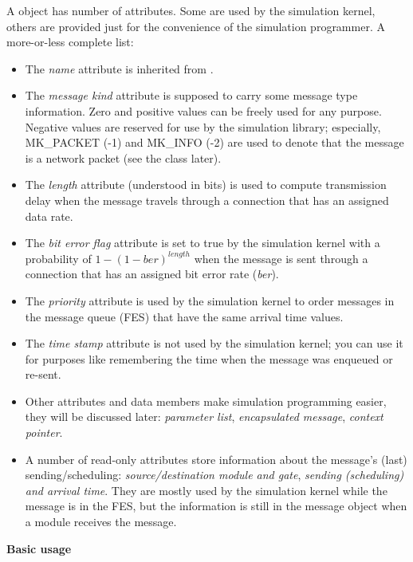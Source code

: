 A  object has number of attributes. Some are used by 
the simulation kernel, others are provided just for the convenience 
of the simulation programmer. A more-or-less complete list:
\begin{itemize}
  \item{The \textit{name} attribute is inherited from .}
  \item{The \textit{message kind} attribute is supposed to carry some message 
    type information. Zero and positive values can be freely used 
    for any purpose. Negative values are reserved for use by the 
    {\opp} simulation library; especially, MK\_PACKET (-1) and MK\_INFO 
    (-2) are used to denote that the message is a network packet 
    (see the  class later).}
  \item{The \textit{length} attribute (understood in bits) is used to compute 
    transmission delay when the message travels through a connection 
    that has an assigned data rate.}
  \item{The \textit{bit error flag} attribute is set to true by the simulation 
    kernel with a probability of $1-(1-\textit{ber})^{\mathit{length}}$ when the 
    message is sent through a connection that has an assigned bit 
    error rate (\textit{ber}).}
  \item{The \textit{priority} attribute is used by the simulation kernel to 
    order messages in the message queue (FES) that have the same 
    arrival time values.}
  \item{The \textit{time stamp} attribute is not used by the simulation kernel; 
    you can use it for purposes like remembering the time when the 
    message was enqueued or re-sent.}
  \item{Other attributes and data members make simulation programming 
    easier, they will be discussed later: \textit{parameter list}, \textit{encapsulated 
      message}, \textit{context pointer}.}
  \item{A number of read-only attributes store information about the 
    message's (last) sending/scheduling: \textit{source/destination module 
      and gate}, \textit{sending (scheduling) and arrival time}. They are 
    mostly used by the simulation kernel while the message is in 
    the FES, but the information is still in the message object when 
    a module receives the message.}
\end{itemize}


\textbf{Basic usage}


